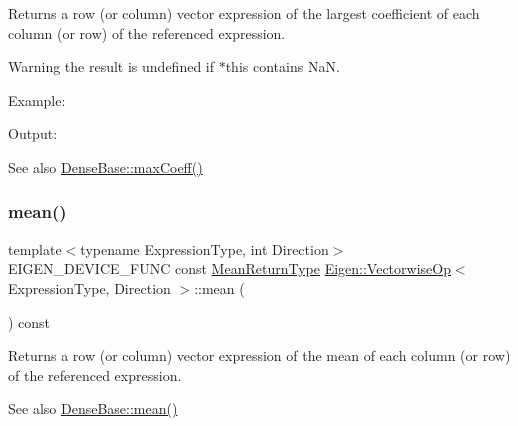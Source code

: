 \begin{DoxyReturn}{Returns}
a row (or column) vector expression of the largest coefficient of each column (or row) of the referenced expression.
\end{DoxyReturn}
\begin{DoxyWarning}{Warning}
the result is undefined if {\ttfamily $\ast$this} contains NaN.
\end{DoxyWarning}
Example\+: 
\begin{DoxyCodeInclude}{0}
\end{DoxyCodeInclude}
 Output\+: 
\begin{DoxyVerbInclude}
\end{DoxyVerbInclude}


\begin{DoxySeeAlso}{See also}
\mbox{\hyperlink{class_eigen_1_1_dense_base_ac0d151ec47eb7a44a3a5ba1587ddbeb4}{Dense\+Base\+::max\+Coeff()}} 
\end{DoxySeeAlso}
\mbox{\label{class_eigen_1_1_vectorwise_op_aea15d46c791ef6d17860fc8a61a5fbd6}} 
\subsubsection{\texorpdfstring{mean()}{mean()}}
{\footnotesize\ttfamily template$<$typename Expression\+Type, int Direction$>$ \\
E\+I\+G\+E\+N\+\_\+\+D\+E\+V\+I\+C\+E\+\_\+\+F\+U\+NC const \mbox{\hyperlink{class_eigen_1_1_partial_redux_expr}{Mean\+Return\+Type}} \mbox{\hyperlink{class_eigen_1_1_vectorwise_op}{Eigen\+::\+Vectorwise\+Op}}$<$ Expression\+Type, Direction $>$\+::mean (\begin{DoxyParamCaption}{ }\end{DoxyParamCaption}) const\hspace{0.3cm}{\ttfamily [inline]}}

\begin{DoxyReturn}{Returns}
a row (or column) vector expression of the mean of each column (or row) of the referenced expression.
\end{DoxyReturn}
\begin{DoxySeeAlso}{See also}
\mbox{\hyperlink{class_eigen_1_1_dense_base_a89d85ac0cf349eb53481c148033459d7}{Dense\+Base\+::mean()}} 
\end{DoxySeeAlso}
\mbox{\label{class_eigen_1_1_vectorwise_op_a05f6f60662c06b4987e7eaf747a032c0}} 
